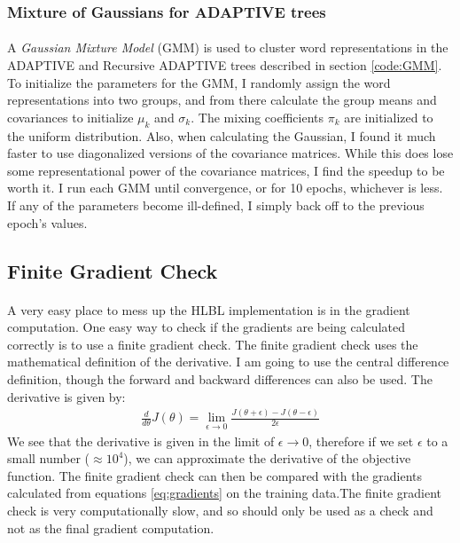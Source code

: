 \documentclass[12pt]{ociamthesis}  %
\begin{document}
\subsubsection{Mixture of Gaussians for ADAPTIVE trees}
\paragraph{}
A \emph{Gaussian Mixture Model} (GMM) is used to cluster word representations in the ADAPTIVE and Recursive ADAPTIVE trees described in section \ref{code:GMM}. To initialize the parameters for the GMM, I randomly assign the word representations into two groups, and from there calculate the group means and covariances to initialize $\mu_k$ and $\sigma_k$. The mixing coefficients $\pi_k$ are initialized to the uniform distribution. Also, when calculating the Gaussian, I found it much faster to use diagonalized versions of the covariance matrices. While this does lose some representational power of the covariance matrices, I find the speedup to be worth it. I run each GMM until convergence, or for 10 epochs, whichever is less. If any of the parameters become ill-defined, I simply back off to the previous epoch's values. 

\subsection{Finite Gradient Check}
\paragraph{}
A very easy place to mess up the HLBL implementation is in the gradient computation. One easy way to check if the gradients are being calculated correctly is to use a finite gradient check. The finite gradient check uses the mathematical definition of the derivative. I am going to use the central difference definition, though the forward and backward differences can also be used. The derivative is given by:
\begin{align}
\frac{d}{d\theta} J(\theta) = \lim_{\epsilon \to 0} \frac{ J({\theta + \epsilon} )- J({\theta - \epsilon}) } {2 \epsilon}
\end{align}
We see that the derivative is given in the limit of $\epsilon \to 0$, therefore if we set $\epsilon$ to a small number ($\approx10^4$), we can approximate the derivative of the objective function. The finite gradient check can then be compared with the gradients calculated from equations \ref{eq:gradients} on the training data.The finite gradient check is very computationally slow, and so should only be used as a check and not as the final gradient computation.
\end{document}
